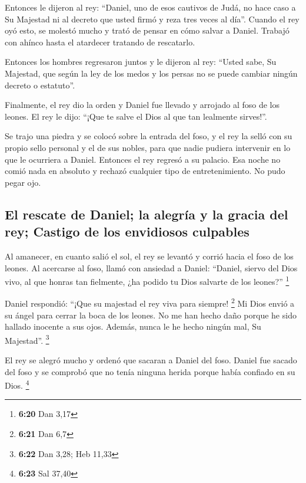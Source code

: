  Entonces le dijeron al rey: ``Daniel, uno de esos
cautivos de Judá, no hace caso a Su Majestad ni al decreto que usted
firmó y reza tres veces al día''.  Cuando el rey oyó
esto, se molestó mucho y trató de pensar en cómo salvar a Daniel.
Trabajó con ahínco hasta el atardecer tratando de rescatarlo.

 Entonces los hombres regresaron juntos y le dijeron al
rey: ``Usted sabe, Su Majestad, que según la ley de los medos y los
persas no se puede cambiar ningún decreto o estatuto''.

 Finalmente, el rey dio la orden y Daniel fue llevado y
arrojado al foso de los leones. El rey le dijo: ``¡Que te salve el Dios
al que tan lealmente sirves!''.

 Se trajo una piedra y se colocó sobre la entrada del
foso, y el rey la selló con su propio sello personal y el de sus nobles,
para que nadie pudiera intervenir en lo que le ocurriera a Daniel.
 Entonces el rey regresó a su palacio. Esa noche no comió
nada en absoluto y rechazó cualquier tipo de entretenimiento. No pudo
pegar ojo.

\hypertarget{el-rescate-de-daniel-la-alegruxeda-y-la-gracia-del-rey-castigo-de-los-envidiosos-culpables}{%
\subsection{El rescate de Daniel; la alegría y la gracia del rey;
Castigo de los envidiosos
culpables}\label{el-rescate-de-daniel-la-alegruxeda-y-la-gracia-del-rey-castigo-de-los-envidiosos-culpables}}

 Al amanecer, en cuanto salió el sol, el rey se levantó y
corrió hacia el foso de los leones.  Al acercarse al
foso, llamó con ansiedad a Daniel: ``Daniel, siervo del Dios vivo, al
que honras tan fielmente, ¿ha podido tu Dios salvarte de los leones?''
\footnote{\textbf{6:20} Dan 3,17}

 Daniel respondió: ``¡Que su majestad el rey viva para
siempre! \footnote{\textbf{6:21} Dan 6,7}  Mi Dios envió
a su ángel para cerrar la boca de los leones. No me han hecho daño
porque he sido hallado inocente a sus ojos. Además, nunca le he hecho
ningún mal, Su Majestad''. \footnote{\textbf{6:22} Dan 3,28; Heb 11,33}

 El rey se alegró mucho y ordenó que sacaran a Daniel del
foso. Daniel fue sacado del foso y se comprobó que no tenía ninguna
herida porque había confiado en su Dios. \footnote{\textbf{6:23} Sal
  37,40}

